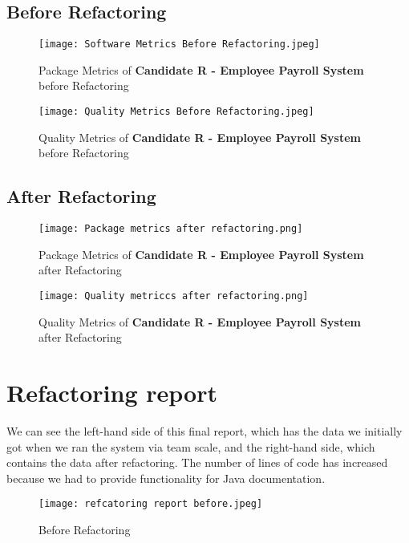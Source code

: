 \documentclass[12pt,english]{article}
\begin{document}
\subsection{Before Refactoring}
\begin{figure}[h!]
    \centering
    \texttt{[image: Software Metrics Before Refactoring.jpeg]}
    \caption{Package Metrics of \textbf{Candidate R - Employee Payroll System} before Refactoring}
\end{figure}

\begin{figure}[h!]
    \centering
    \texttt{[image: Quality Metrics Before Refactoring.jpeg]}
    \caption{Quality Metrics of \textbf{Candidate R - Employee Payroll System} before Refactoring}
\end{figure}

\newpage
\subsection{After Refactoring}
\begin{figure}[h!]
    \centering
    \texttt{[image: Package metrics after refactoring.png]}
    \caption{Package Metrics of \textbf{Candidate R - Employee Payroll System} after Refactoring}
\end{figure}

\begin{figure}[h!]
    \centering
    \texttt{[image: Quality metriccs after refactoring.png]}
    \caption{Quality Metrics of \textbf{Candidate R - Employee Payroll System} after Refactoring}
\end{figure}

\newpage
\section{Refactoring report}

We can see the left-hand side of this final report, which has the data we initially got when we ran the system via team scale, and the right-hand side, which contains the data after refactoring. The number of lines of code has increased because we had to provide functionality for Java documentation. 

\begin{figure}[h!]
    \centering
    \texttt{[image: refcatoring report before.jpeg]}
    \caption{Before Refactoring}
\end{figure}
\end{document}
